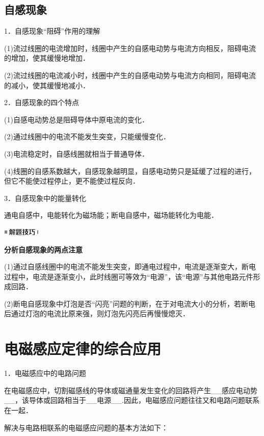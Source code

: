 \subsection{自感现象}

1．自感现象``阻碍''作用的理解

(1)流过线圈的电流增加时，线圈中产生的自感电动势与电流方向相反，阻碍电流的增加，使其缓慢地增加．

(2)流过线圈的电流减小时，线圈中产生的自感电动势与电流方向相同，阻碍电流的减小，使其缓慢地减小．

2．自感现象的四个特点

(1)自感电动势总是阻碍导体中原电流的变化．

(2)通过线圈中的电流不能发生突变，只能缓慢变化．

(3)电流稳定时，自感线圈就相当于普通导体．

(4)线圈的自感系数越大，自感现象越明显，自感电动势只是延缓了过程的进行，但它不能使过程停止，更不能使过程反向．

3．自感现象中的能量转化

通电自感中，电能转化为磁场能；断电自感中，磁场能转化为电能．

\begin{center}\includegraphics[width=0.70764in,height=0.12292in]{media/image37.png}\end{center}
\begin{center}
	\textbf{分析自感现象的两点注意}
\end{center}

(1)通过自感线圈中的电流不能发生突变，即通电过程中，电流是逐渐变大，断电过程中，电流是逐渐变小，此时线圈可等效为``电源''，该``电源''与其他电路元件形成回路．

(2)断电自感现象中灯泡是否``闪亮''问题的判断，在于对电流大小的分析，若断电后通过灯泡的电流比原来强，则灯泡先闪亮后再慢慢熄灭．


\newpage
\section{电磁感应定律的综合应用}

1．电磁感应中的电路问题

在电磁感应中，切割磁感线的导体或磁通量发生变化的回路将产生\_\_感应电动势\_\_，该导体或回路相当于\_\_电源\_\_.因此，电磁感应问题往往又和电路问题联系在一起．

解决与电路相联系的电磁感应问题的基本方法如下：

